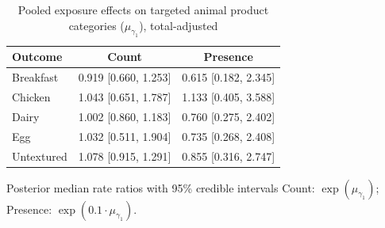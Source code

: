 \begin{table}[H]
\centering
\caption{Pooled exposure effects on targeted animal product categories ($\mu_{\gamma_1}$), total-adjusted}
\label{tab:a2_mu_gamma_adj}
\begin{tabular}{lcc}
\toprule
Outcome & Count & Presence \\
\midrule
Breakfast & 0.919 [0.660, 1.253] & 0.615 [0.182, 2.345] \\
Chicken & 1.043 [0.651, 1.787] & 1.133 [0.405, 3.588] \\
Dairy & 1.002 [0.860, 1.183] & 0.760 [0.275, 2.402] \\
Egg & 1.032 [0.511, 1.904] & 0.735 [0.268, 2.408] \\
Untextured & 1.078 [0.915, 1.291] & 0.855 [0.316, 2.747] \\
\bottomrule
\end{tabular}
\par\smallskip\footnotesize Posterior median rate ratios with 95\% credible intervals Count: $\exp(\mu_{\gamma_1})$; Presence: $\exp(0.1 \cdot \mu_{\gamma_1})$.
\end{table}
